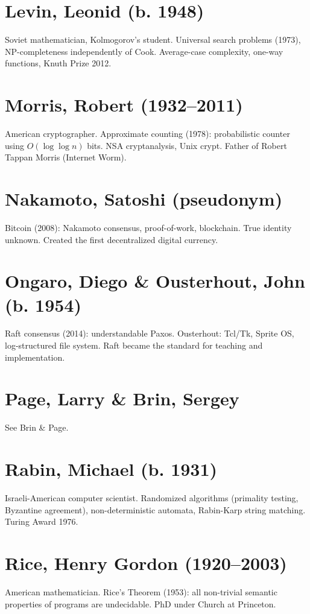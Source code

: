 \section*{Levin, Leonid (b. 1948)}
Soviet mathematician, Kolmogorov's student. Universal search problems (1973), NP-completeness independently of Cook. Average-case complexity, one-way functions, Knuth Prize 2012.

\section*{Morris, Robert (1932--2011)}
American cryptographer. Approximate counting (1978): probabilistic counter using $O(\log \log n)$ bits. NSA cryptanalysis, Unix crypt. Father of Robert Tappan Morris (Internet Worm).

\section*{Nakamoto, Satoshi (pseudonym)}
Bitcoin (2008): Nakamoto consensus, proof-of-work, blockchain. True identity unknown. Created the first decentralized digital currency.

\section*{Ongaro, Diego \& Ousterhout, John (b. 1954)}
Raft consensus (2014): understandable Paxos. Ousterhout: Tcl/Tk, Sprite OS, log-structured file system. Raft became the standard for teaching and implementation.

\section*{Page, Larry \& Brin, Sergey}
See Brin \& Page.

\section*{Rabin, Michael (b. 1931)}
Israeli-American computer scientist. Randomized algorithms (primality testing, Byzantine agreement), non-deterministic automata, Rabin-Karp string matching. Turing Award 1976.

\section*{Rice, Henry Gordon (1920--2003)}
American mathematician. Rice's Theorem (1953): all non-trivial semantic properties of programs are undecidable. PhD under Church at Princeton.

